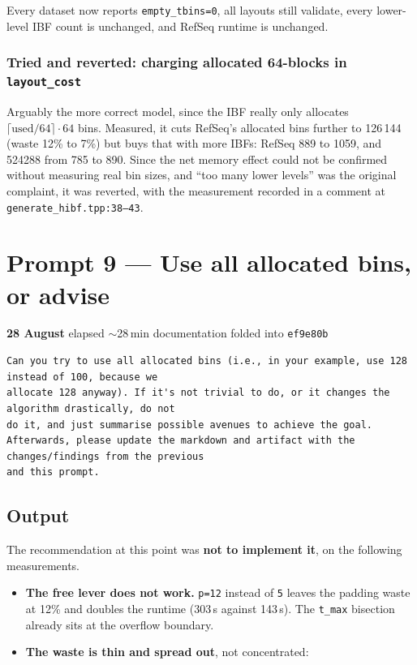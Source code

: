 \documentclass[11pt,a4paper]{article}
\newenvironment{promptbox}{\medskip}{\medskip}
\newcommand{\code}[1]{\lstinline[basicstyle=\ttfamily\small]!#1!}
\newcommand{\sha}[1]{\texttt{#1}}
\begin{document}
\noindent Every dataset now reports \texttt{empty\_tbins=0}, all layouts still validate, every
lower-level IBF count is unchanged, and RefSeq runtime is unchanged.

\subsubsection*{Tried and reverted: charging allocated 64-blocks in \texttt{layout\_cost}}

Arguably the more correct model, since the IBF really only allocates
$\lceil \text{used}/64 \rceil \cdot 64$ bins. Measured, it cuts RefSeq's allocated bins further to
126\,144 (waste 12\% to 7\%) but buys that with more IBFs: RefSeq 889 to 1059, and 524288 from 785
to 890. Since the net memory effect could not be confirmed without measuring real bin sizes, and
``too many lower levels'' was the original complaint, it was reverted, with the measurement recorded
in a comment at \texttt{generate\_hibf.tpp:38--43}.

\section{Prompt 9 --- Use all allocated bins, or advise}
\textbf{28 August} \textperiodcentered{} elapsed ${\sim}$28\,min \textperiodcentered{} documentation folded into \sha{ef9e80b}
\begin{promptbox}
\begin{lstlisting}[style=promptstyle]
Can you try to use all allocated bins (i.e., in your example, use 128 instead of 100, because we
allocate 128 anyway). If it's not trivial to do, or it changes the algorithm drastically, do not
do it, and just summarise possible avenues to achieve the goal.
Afterwards, please update the markdown and artifact with the changes/findings from the previous
and this prompt.
\end{lstlisting}
\end{promptbox}
\subsection*{Output}

The recommendation at this point was \textbf{not to implement it}, on the following measurements.

\begin{itemize}[leftmargin=*]
\item \textbf{The free lever does not work.} \texttt{p=12} instead of \texttt{5} leaves the padding
waste at 12\% and doubles the runtime (303\,s against 143\,s). The \code{t_max} bisection already
sits at the overflow boundary.
\item \textbf{The waste is thin and spread out}, not concentrated:
\end{itemize}
\end{document}
